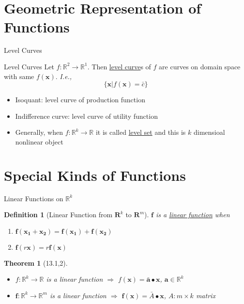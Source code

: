 \documentclass[a4paper,11pt]{article}
\newtheorem{defn}{Definition}
\newtheorem{thm}{Theorem}
\begin{document}
\section{Geometric Representation of Functions} %
\label{sec:geometric_representation_of_functions}
\begin{frame}[t]{Level Curves}
	\begin{block}
		{Level Curves}
		Let $f:\mathbb{R}^2\rightarrow\mathbb{R}^1$. Then \uline{level curve}s of $f$ are curves on domain space with same $f(\mathbf{x})$. \textit{I.e.,}
		\[
			\{\mathbf{x}\vert f(\mathbf{x})=\bar c\}
		\]
		\begin{itemize}
			\item Isoquant: level curve of production function
			\item Indifference curve: level curve of utility function
			\item Generally, when $f:\mathbb{R}^k\rightarrow\mathbb{R}$ it is called \uline{level set} and this is $k$ dimensioal nonlinear object
		\end{itemize}
	\end{block}
\end{frame}

\section{Special Kinds of Functions} %
\label{sec:special_kinds_of_functions}
\begin{frame}[t]{Linear Functions on $\mathbb{R}^k$}
	\begin{defn}
		[Linear Function from $\mathbf{R}^k$ to $\mathbf{R}^m$]
		$\mathbf{f}$ is a \uline{linear function} when
		\begin{enumerate}
			\item $\mathbf{f}(\mathbf{x_1}+\mathbf{x_2})=\mathbf{f}(\mathbf{x_1})+\mathbf{f}(\mathbf{x_2})$
			\item $\mathbf{f}(r\mathbf{x})=r\mathbf{f(x)}$
		\end{enumerate}
	\end{defn}
	\begin{thm}
		[13.1,2] \begin{itemize}
			\item $f:\mathbb{R}^k\rightarrow\mathbb{R}$ is a linear function $\Rightarrow$ $f(\mathbf{x})=\bar{\mathbf{a}}\bullet\mathbf{x}$, $\mathbf{a}\in\mathbb{R}^k$
			\item $\mathbf{f}:\mathbb{R}^k\rightarrow\mathbb{R}^m$ is a linear function $\Rightarrow$ $\mathbf{f}(\mathbf{x})=\bar A\bullet\mathbf{x}$, $A:m\times k$ matrix
		\end{itemize}
		
	\end{thm}
\end{frame}
\end{document}
